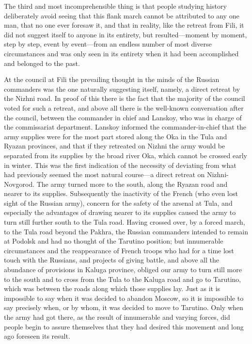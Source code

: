 The third and most incomprehensible thing is that people studying
history deliberately avoid seeing that this flank march cannot be
attributed to any one man, that no one ever foresaw it, and that
in reality, like the retreat from Fili, it did not suggest itself
to anyone in its entirety, but resulted---moment by moment, step
by step, event by event---from an endless number of most diverse
circumstances and was only seen in its entirety when it had been
accomplished and belonged to the past.

At the council at Fili the prevailing thought in the minds of the
Russian commanders was the one naturally suggesting itself,
namely, a direct retreat by the Nizhni road. In proof of this
there is the fact that the majority of the council voted for such
a retreat, and above all there is the well-known conversation
after the council, between the commander in chief and Lanskoy,
who was in charge of the commissariat department. Lanskoy
informed the commander-in-chief that the army supplies were for
the most part stored along the Oka in the Tula and Ryazan
provinces, and that if they retreated on Nizhni the army would be
separated from its supplies by the broad river Oka, which cannot
be crossed early in winter. This was the first indication of the
necessity of deviating from what had previously seemed the most
natural course---a direct retreat on Nizhni-Novgorod. The army
turned more to the south, along the Ryazan road and nearer to its
supplies. Subsequently the inactivity of the French (who even
lost sight of the Russian army), concern for the safety of the
arsenal at Tula, and especially the advantages of drawing nearer
to its supplies caused the army to turn still further south to
the Tula road. Having crossed over, by a forced march, to the
Tula road beyond the Pakhra, the Russian commanders intended to
remain at Podolsk and had no thought of the Tarutino position;
but innumerable circumstances and the reappearance of French
troops who had for a time lost touch with the Russians, and
projects of giving battle, and above all the abundance of
provisions in Kaluga province, obliged our army to turn still
more to the south and to cross from the Tula to the Kaluga road
and go to Tarutino, which was between the roads along which those
supplies lay. Just as it is impossible to say when it was decided
to abandon Moscow, so it is impossible to say precisely when, or
by whom, it was decided to move to Tarutino. Only when the army
had got there, as the result of innumerable and varying forces,
did people begin to assure themselves that they had desired this
movement and long ago foreseen its result.

